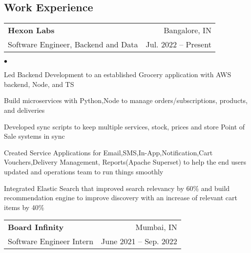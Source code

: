 \documentclass[margin, 11pt]{res}
\makeatletter
\newcommand{\li}{https://linkedin.com/in/jakegut}
\newcommand{\gh}{https://github.com/jakegut}
\newcommand{\personalsite}{https://jakegut.com}
\newcommand{\resumeSubheading}[4]{

\begin{tabular*}{1.01\textwidth}{@{\hspace{-4pt}}l @{\extracolsep{\fill}} r}
\textbf{#1} & #2 \\
      {#3} &  {#4}
\end{tabular*}\vspace{-2pt}
}
\newenvironment{list2}{
	\begin{list}{$\bullet$}{%
	    \small
		\setlength{\itemsep}{0in}
		\setlength{\parsep}{0in} \setlength{\parskip}{0in}
		\setlength{\topsep}{0in} \setlength{\partopsep}{0in}
		\setlength{\leftmargin}{0.2in}}}{\end{list}}
\makeatother
\begin{document}
\address{
    \small +91-6301786793 $|$ 
    \href{mailto:harishvadapartygmail.com}{harishvadaparty@gmail.com} $|$ 
    \href{\li}{linkedin.com/in/harishvadaparty} $|$
    \href{\gh}{github.com/Harryalways317}
}

\begin{resume}

\section{\sc Work Experience}

\vspace{2pt}

\resumeSubheading{{\bf Hexon Labs}}{Bangalore, IN}
                 {Software Engineer, Backend and Data}{Jul. 2022 -- Present}

\begin{list2}
\item{Led Backend Development to an established Grocery application with AWS backend, Node, and TS}
\item{Build microservices with Python,Node to  manage orders/subscriptions, products, and deliveries}
\item{Developed sync scripts to keep multiple services, stock, prices and store Point of Sale systems in sync}
\item{Created Service Applications for Email,SMS,In-App,Notification,Cart Vouchers,Delivery Management, Reports(Apache Superset) to help the end users updated and operations team to run things smoothly}
\item{Integrated Elastic Search that improved search relevancy by 60\% and build recommendation engine to improve discovery with an increase of relevant cart items by 40\% }
\end{list2}
\resumeSubheading{{\bf Board Infinity}}{Mumbai, IN}
                 {Software Engineer Intern}{June 2021 -- Sep. 2022}
                 

\end{resume}
\end{document}
